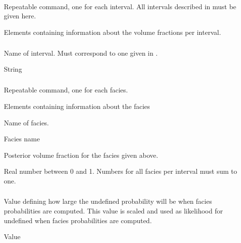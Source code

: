{\paragraph{}
 \slist
   \item \Description Repeatable command, one for each interval. All intervals described in  must be given here.
   \item \Argument Elements containing information about the volume fractions per interval.
   \item \Default
 \elist

\subparagraph{}
 \slist
   \item \Description Name of interval. Must correspond to one given in .
   \item \Argument String
   \item \Default
 \elist

\subparagraph{}
 \slist
   \item \Description Repeatable command, one for each facies.
   \item \Argument Elements containing information about the facies
   \item \Default
 \elist

 \slist
   \item \Description Name of facies.
   \item \Argument Facies name
   \item \Default
 \elist

 \slist
   \item \Description Posterior volume fraction for the facies given above.
   \item \Argument Real number between 0 and 1. Numbers for all facies per interval must sum to one.
   \item \Default
 \elist

\subsubsection{}
 \slist
   \item \Description Value defining how large the undefined
     probability will be when facies probabilities are computed. This
     value is scaled and used as likelihood for undefined when facies
     probabilities are computed.
   \item \Argument Value
   \item {}
 \elist

}
